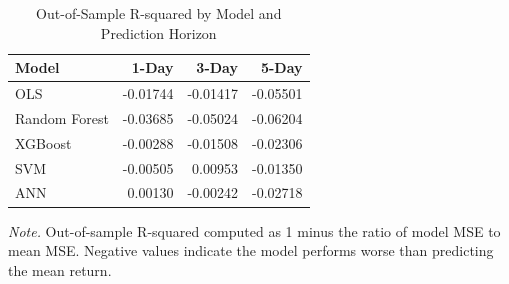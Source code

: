 \begin{table}[!ht]
\centering
\begin{threeparttable}
\caption{Out-of-Sample R-squared by Model and Prediction Horizon}
\label{tab:eval_r2}

\begin{tabular}{lrrr}
\toprule
Model & 1-Day & 3-Day & 5-Day\\
\midrule
OLS & -0.01744 & -0.01417 & -0.05501\\
Random Forest & -0.03685 & -0.05024 & -0.06204\\
XGBoost & -0.00288 & -0.01508 & -0.02306\\
SVM & -0.00505 & 0.00953 & -0.01350\\
ANN & 0.00130 & -0.00242 & -0.02718\\
\bottomrule
\end{tabular}
\begin{tablenotes}
\footnotesize
\item \textit{Note.} Out-of-sample R-squared computed as 1 minus the ratio of model MSE to mean MSE. Negative values indicate the model performs worse than predicting the mean return.
\end{tablenotes}
\end{threeparttable}
\end{table}
